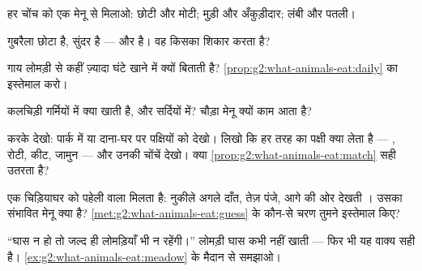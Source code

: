 \begin{exercise}[$\star$]\label{exo:g2:what-animals-eat:4}
हर चोंच को एक मेनू से मिलाओ: छोटी और मोटी; मुड़ी और अँकुड़ीदार; लंबी
और पतली।
\end{exercise}

\begin{exercise}[$\star$]\label{exo:g2:what-animals-eat:5}
गुबरैला छोटा है, सुंदर है --- और  है। वह किसका शिकार करता
है?
\end{exercise}

\begin{exercise}[$\star$]\label{exo:g2:what-animals-eat:6}
गाय लोमड़ी से कहीं ज़्यादा घंटे खाने में क्यों बिताती है?
\cref{prop:g2:what-animals-eat:daily} का इस्तेमाल करो।
\end{exercise}

\begin{exercise}[$\star$]\label{exo:g2:what-animals-eat:7}
कलचिड़ी गर्मियों में क्या खाती है, और सर्दियों में? चौड़ा मेनू क्यों
काम आता है?
\end{exercise}

\begin{exercise}[$\star$]\label{exo:g2:what-animals-eat:8}
करके देखो: पार्क में या दाना-घर पर पक्षियों को देखो। लिखो कि हर तरह का
पक्षी क्या लेता है --- , रोटी, कीट, जामुन --- और उनकी चोंचें देखो।
क्या \cref{prop:g2:what-animals-eat:match} सही उतरता है?
\end{exercise}

\begin{exercise}[$\star\star$]\label{exo:g2:what-animals-eat:9}
एक चिड़ियाघर को पहेली वाला  मिलता है: नुकीले अगले दाँत, तेज़ पंजे,
आगे की ओर देखती । उसका संभावित मेनू क्या है?
\cref{met:g2:what-animals-eat:guess} के कौन-से चरण तुमने इस्तेमाल किए?
\end{exercise}

\begin{exercise}[$\star\star$]\label{exo:g2:what-animals-eat:10}
``घास न हो तो जल्द ही लोमड़ियाँ भी न रहेंगी।'' लोमड़ी घास कभी नहीं
खाती --- फिर भी यह वाक्य सही है।
\cref{ex:g2:what-animals-eat:meadow} के मैदान से समझाओ।
\end{exercise}
